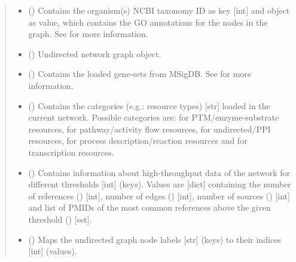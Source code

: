 \documentclass[letterpaper,10pt,english]{sphinxmanual}
\begin{document}
\begin{fulllineitems}
\begin{quote}
\begin{description}
\begin{itemize}
\item {} 
 () \textendash{} Contains the organism(s) NCBI taxonomy ID as key {[}int{]} and
 object as value, which
contains the GO annotations for the nodes in the graph. See
 for more information.

\item {} 
 () \textendash{} Undirected network graph object.

\item {} 
 () \textendash{} Contains the loaded gene-sets from MSigDB. See
 for more information.

\item {} 
 () \textendash{} Contains the categories (e.g.: resource types) {[}str{]} loaded in
the current network. Possible categories are:  for
PTM/enzyme-substrate resources,  for pathway/activity
flow resources,  for undirected/PPI resources, 
for process description/reaction resources and  for
transcription resources.

\item {} 
 () \textendash{} Contains information about high-throughput data of the network
for different thresholds {[}int{]} (keys). Values are {[}dict{]}
containing the number of references () {[}int{]}, number
of edges () {[}int{]}, number of sources ()
{[}int{]} and list of PMIDs of the most common references above the
given threshold () {[}set{]}.

\item {} 
 () \textendash{} Maps the undirected graph node labels {[}str{]} (keys) to their
indices {[}int{]} (values).


\end{itemize}
\end{description}
\end{quote}
\end{fulllineitems}
\end{document}
